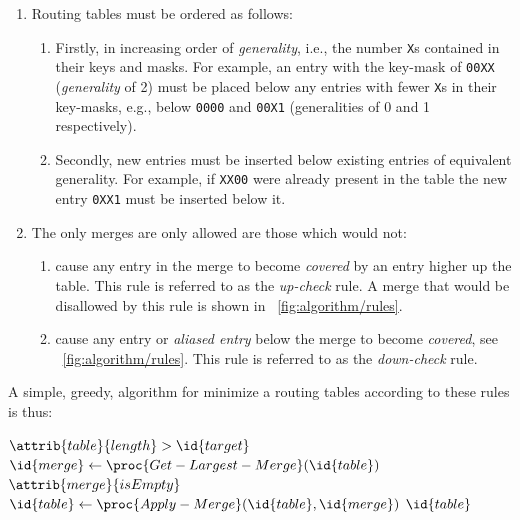 \documentclass[conference]{IEEEtran}
\newcommand{\mytt}[1]{\texttt{\footnotesize#1}}
\begin{document}
  \begin{enumerate}[\IEEEsetlabelwidth{3)}]
    \item Routing tables must be ordered as follows:
      \begin{enumerate}[\IEEEsetlabelwidth{a)}]
        \item Firstly, in increasing order of \textit{generality}, i.e., the number \mytt{X}s contained in their keys and masks.
              For example, an entry with the key-mask of \mytt{00XX} (\textit{generality} of 2) must be placed below any entries with fewer \mytt{X}s in their key-masks, e.g., below \mytt{0000} and \mytt{00X1} (generalities of 0 and 1 respectively).
        \item Secondly, new entries must be inserted below existing entries of equivalent generality.
              For example, if \mytt{XX00} were already present in the table the new entry \mytt{0XX1} must be inserted below it.
      \end{enumerate}
    \item The only merges are only allowed are those which would not:
      \begin{enumerate}[\IEEEsetlabelwidth{b)}]
        \item cause any entry in the merge to become \textit{covered} by an entry higher up the table.
              This rule is referred to as the \textit{up-check} rule.
              A merge that would be disallowed by this rule is shown in \figurename~\ref{fig:algorithm/rules}.
            \item cause any entry or \textit{aliased entry} below the merge to become \textit{covered}, see \figurename~\ref{fig:algorithm/rules}.
              This rule is referred to as the \textit{down-check} rule.
      \end{enumerate}
  \end{enumerate}

  A simple, greedy, algorithm for minimize a routing tables according to these rules is thus:\par\nopagebreak
  \begin{codebox}
    \li \While $\attrib{table}{length} >  \id{target}$
    \li \Do $\id{merge} \gets \proc{Get-Largest-Merge}(\id{table})$
    \li     \If $\attrib{merge}{isEmpty}$
    \li     \Then {} \End
    \li     $\id{table} \gets \proc{Apply-Merge}(\id{table}, \id{merge})$
        \End
    \li \Return $\id{table}$
  \end{codebox}
\end{document}
